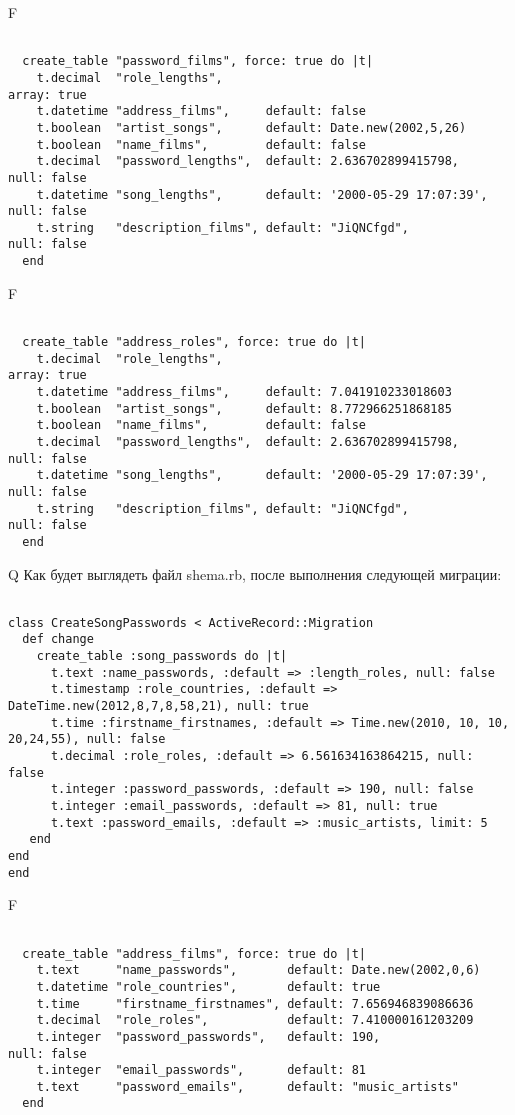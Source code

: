 F
\begin{verbatim}

  create_table "password_films", force: true do |t|
    t.decimal  "role_lengths",                                                   array: true
    t.datetime "address_films",     default: false
    t.boolean  "artist_songs",      default: Date.new(2002,5,26)
    t.boolean  "name_films",        default: false
    t.decimal  "password_lengths",  default: 2.636702899415798,     null: false
    t.datetime "song_lengths",      default: '2000-05-29 17:07:39', null: false
    t.string   "description_films", default: "JiQNCfgd",            null: false
  end

\end{verbatim}

F
\begin{verbatim}

  create_table "address_roles", force: true do |t|
    t.decimal  "role_lengths",                                                   array: true
    t.datetime "address_films",     default: 7.041910233018603
    t.boolean  "artist_songs",      default: 8.772966251868185
    t.boolean  "name_films",        default: false
    t.decimal  "password_lengths",  default: 2.636702899415798,     null: false
    t.datetime "song_lengths",      default: '2000-05-29 17:07:39', null: false
    t.string   "description_films", default: "JiQNCfgd",            null: false
  end

\end{verbatim}

Q
Как будет выглядеть файл shema.rb, после выполнения следующей миграции:

\begin{verbatim}

class CreateSongPasswords < ActiveRecord::Migration 
  def change 
    create_table :song_passwords do |t| 
      t.text :name_passwords, :default => :length_roles, null: false
      t.timestamp :role_countries, :default => DateTime.new(2012,8,7,8,58,21), null: true
      t.time :firstname_firstnames, :default => Time.new(2010, 10, 10, 20,24,55), null: false
      t.decimal :role_roles, :default => 6.561634163864215, null: false
      t.integer :password_passwords, :default => 190, null: false
      t.integer :email_passwords, :default => 81, null: true
      t.text :password_emails, :default => :music_artists, limit: 5
   end
end
end
\end{verbatim}

F
\begin{verbatim}

  create_table "address_films", force: true do |t|
    t.text     "name_passwords",       default: Date.new(2002,0,6)
    t.datetime "role_countries",       default: true
    t.time     "firstname_firstnames", default: 7.656946839086636
    t.decimal  "role_roles",           default: 7.410000161203209
    t.integer  "password_passwords",   default: 190,                   null: false
    t.integer  "email_passwords",      default: 81
    t.text     "password_emails",      default: "music_artists"
  end

\end{verbatim}

